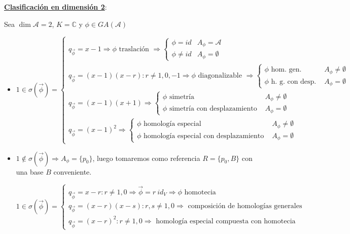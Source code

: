 \documentclass[10pt,a4paper,openright]{book}
\theoremstyle{break}
\begin{document}
\underline{\textbf{Clasificación en dimensión 2}}:

Sea $\dim \mathcal{A} = 2$, $K = \mathbb{C}$ y $\phi \in GA(\mathcal{A})$
\begin{itemize}
\item $1 \in \sigma(\vec{\phi}) = \begin{cases} q_{\vec{\phi}} = x - 1 \Rightarrow \phi \mbox{ traslación } \Rightarrow \begin{cases} \phi = id & A_\phi = \mathcal{A} \\ \phi \neq id & A_\phi = \emptyset \end{cases} \\ q_{\vec{\phi}} = (x-1)(x-r) : r \neq 1,0,-1 \Rightarrow \phi \mbox{ diagonalizable } \Rightarrow \begin{cases} \phi \mbox{ hom. gen. } & A_\phi \neq \emptyset \\ \phi \mbox{ h. g. con desp. } & A_\phi = \emptyset \end{cases} \\ q_{\vec{\phi}} = (x-1)(x+1) \Rightarrow \begin{cases} \phi \mbox{ simetría } & A_\phi \neq \emptyset \\  \phi \mbox{ simetría con desplazamiento } & A_\phi = \emptyset\end{cases} \\ q_{\vec{\phi}} = (x-1)^2  \Rightarrow \begin{cases} \phi \mbox{ homología especial } & A_\phi \neq \emptyset \\ \phi \mbox{ homología especial con desplazamiento } & A_\phi = \emptyset   \end{cases} \end{cases}$

\item $1 \notin \sigma(\vec{\phi}) \Rightarrow A_\phi = \{ p_0\}$, luego tomaremos como referencia $R=\{p_0, B\}$ con una base $B$ conveniente.

$1 \in \sigma(\vec{\phi}) = \begin{cases} q_{\vec{\phi}} = x - r : r \neq 1,0 \Rightarrow \vec{\phi} = r \ id_V \Rightarrow \phi \mbox{ homotecia } \\  q_{\vec{\phi}} = (x - r)(x-s) : r,s \neq 1,0 \Rightarrow \mbox{ composición de homologías generales } \\ q_{\vec{\phi}} = (x - r)^2 : r \neq 1,0 \Rightarrow \mbox{ homología especial compuesta con homotecia } \end{cases}$


\end{itemize}
\end{document}
